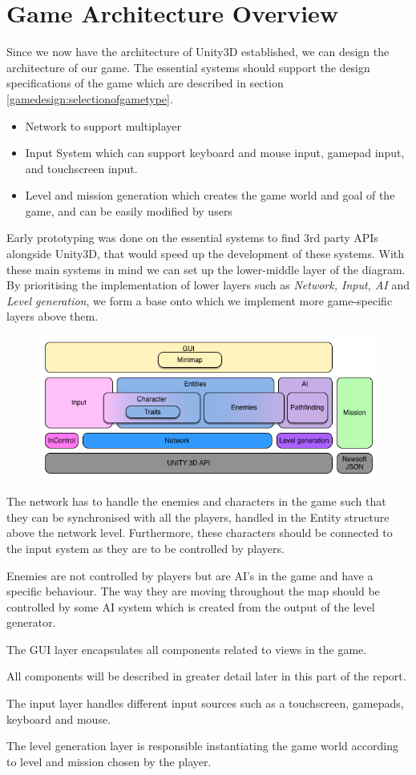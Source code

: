 \section{Game Architecture Overview}
Since we now have the architecture of Unity3D established, we can design the architecture of our game.
The essential systems should support the design specifications of the game which are described in section \ref{gamedesign:selectionofgametype}.
\begin{itemize}
    \item Network to support multiplayer
    \item Input System which can support keyboard and mouse input, gamepad input, and touchscreen input.
    \item Level and mission generation which creates the game world and goal of the game, and can be easily modified by users
\end{itemize}
Early prototyping was done on the essential systems to find 3rd party APIs alongside Unity3D, that would speed up the development of these systems.
With these main systems in mind we can set up the lower-middle layer of the diagram.
By prioritising the implementation of lower layers such as \textit{Network, Input, AI} and \textit{Level generation}, we form a base onto which we implement more game-specific layers above them.

\begin{figure}
\includegraphics[width = \textwidth]{figures/architecture/game_architecture_overview.png}
\end{figure}

The network has to handle the enemies and characters in the game such that they can be synchronised with all the players, handled in the Entity structure above the network level.
Furthermore, these characters should be connected to the input system as they are to be controlled by players.

Enemies are not controlled by players but are AI's in the game and have a specific behaviour.
The way they are moving throughout the map should be controlled by some AI system which is created from the output of the level generator.

The GUI layer encapsulates all components related to views in the game.

All components will be described in greater detail later in this part of the report.

The input layer handles different input sources such as a touchscreen, gamepads, keyboard and mouse.

The level generation layer is responsible instantiating the game world according to level and mission chosen by the player.
